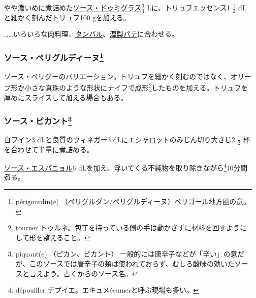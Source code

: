 \begin{recette}
やや濃いめに煮詰めた\protect\hyperlink{sauce-demi-glace}{ソース・ドゥミグラス}\(\frac{3}{4}\)
Lに、トリュフエッセンス1 \(\frac{1}{2}\) dLと細かく刻んだトリュフ100
gを加える。

\ldots{}\ldots{}いろいろな肉料理、\protect\hyperlink{}{タンバル}、\protect\hyperlink{}{温製パテ}に合わせる。

\hypertarget{sauce-perigourdine}{%
\subsubsection[ソース・ペリグルディーヌ]{\texorpdfstring{ソース・ペリグルディーヌ\footnote{périgourdin(e)
  （ペリグルダン/ペリグルディーヌ）ペリゴール地方風の意。}}{ソース・ペリグルディーヌ}}\label{sauce-perigourdine}}



ソース・ペリグーのバリエーション。トリュフを細かく刻むのではなく、オリーブ形か小さな真珠のような形状にナイフで成形\footnote{tourner
  トゥルネ。包丁を持っている側の手は動かさずに材料を回すようにして形を整えること。}したものを加える。トリュフを厚めにスライスして加える場合もある。

\hypertarget{sauce-piquante}{%
\subsubsection[ソース・ピカント]{\texorpdfstring{ソース・ピカント\footnote{piquant(e)
  （ピカン、ピカント）
  一般的には唐辛子などが「辛い」の意だが、このソースでは唐辛子の類は使われておらず、むしろ酸味の効いたソースと言えよう。古くからのソース名。}}{ソース・ピカント}}\label{sauce-piquante}}



白ワイン3 dLと良質のヴィネガー3 dLにエシャロットのみじん切り大さじ2
\(\frac{1}{2}\) 杯を合わせて半量に煮詰める。

\protect\hyperlink{sauce-espagnole}{ソース・エスパニョル}6
dLを加え、浮いてくる不純物を取り除きながら\footnote{dépouiller
  デプイエ。エキュメécumerと呼ぶ現場も多い。}10分間煮る。


\end{recette}
